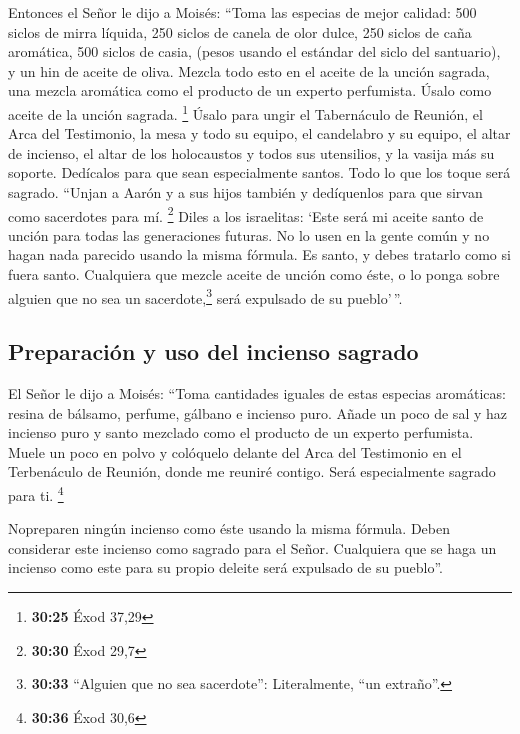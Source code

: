 Entonces el Señor le dijo a Moisés: 
``Toma las especias de mejor calidad: 500 siclos de mirra líquida, 250
siclos de canela de olor dulce, 250 siclos de caña aromática,
 500 siclos de casia, (pesos usando el estándar del siclo
del santuario), y un hin de aceite de oliva.  Mezcla todo
esto en el aceite de la unción sagrada, una mezcla aromática como el
producto de un experto perfumista. Úsalo como aceite de la unción
sagrada. \footnote{\textbf{30:25} Éxod 37,29}  Úsalo para
ungir el Tabernáculo de Reunión, el Arca del Testimonio, 
la mesa y todo su equipo, el candelabro y su equipo, el altar de
incienso,  el altar de los holocaustos y todos sus
utensilios, y la vasija más su soporte.  Dedícalos para
que sean especialmente santos. Todo lo que los toque será sagrado.
 ``Unjan a Aarón y a sus hijos también y dedíquenlos para
que sirvan como sacerdotes para mí. \footnote{\textbf{30:30} Éxod 29,7}
 Diles a los israelitas: `Este será mi aceite santo de
unción para todas las generaciones futuras.  No lo usen
en la gente común y no hagan nada parecido usando la misma fórmula. Es
santo, y debes tratarlo como si fuera santo.  Cualquiera
que mezcle aceite de unción como éste, o lo ponga sobre alguien que no
sea un sacerdote,\footnote{\textbf{30:33} ``Alguien que no sea
  sacerdote'': Literalmente, ``un extraño''.} será expulsado de su
pueblo'\,''.

\hypertarget{preparaciuxf3n-y-uso-del-incienso-sagrado}{%
\subsection{Preparación y uso del incienso
sagrado}\label{preparaciuxf3n-y-uso-del-incienso-sagrado}}

 El Señor le dijo a Moisés: ``Toma cantidades iguales de
estas especias aromáticas: resina de bálsamo, perfume, gálbano e
incienso puro.  Añade un poco de sal y haz incienso puro
y santo mezclado como el producto de un experto perfumista.
 Muele un poco en polvo y colóquelo delante del Arca del
Testimonio en el Terbenáculo de Reunión, donde me reuniré contigo. Será
especialmente sagrado para ti. \footnote{\textbf{30:36} Éxod 30,6}

 Nopreparen ningún incienso como éste usando la misma
fórmula. Deben considerar este incienso como sagrado para el Señor.
 Cualquiera que se haga un incienso como este para su
propio deleite será expulsado de su pueblo''.

